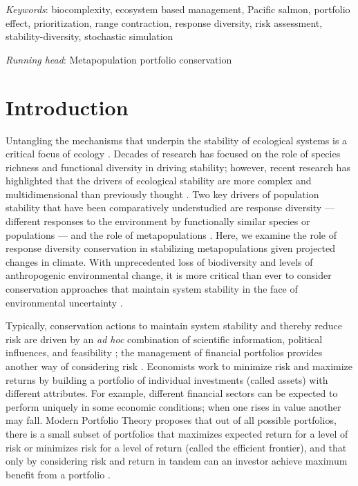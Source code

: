 \noindent
\textit{Keywords}: biocomplexity, ecosystem based management, Pacific salmon, portfolio effect, prioritization, range contraction, response diversity, risk assessment, stability-diversity, stochastic simulation

\noindent
\textit{Running head}: Metapopulation portfolio conservation

\section{Introduction}

Untangling the mechanisms that underpin the stability of ecological systems is a critical focus of ecology \citep[e.g.][]{ives2007, demazancourt2013}. Decades of research has focused on the role of species richness and functional diversity in driving stability; however, recent research has highlighted that the drivers of ecological stability are more complex and multidimensional than previously thought \citep[e.g.][]{balvanera2006, ives2007, demazancourt2013}. Two key drivers of population stability that have been comparatively understudied are response diversity \citep{winfree2009, mori2013} --- different responses to the environment by functionally similar species or populations \citep{elmqvist2003} --- and the role of metapopulations \citep{schtickzelle2007}. Here, we examine the role of response diversity conservation in stabilizing metapopulations given projected changes in climate. With unprecedented loss of biodiversity and levels of anthropogenic environmental change, it is more critical than ever to consider conservation approaches that maintain system stability in the face of environmental uncertainty \citep{lee2008, ando2012}.

Typically, conservation actions to maintain system stability and thereby reduce risk are driven by an \emph{ad hoc} combination of scientific information, political influences, and feasibility \citep{margules2000}; the management of financial portfolios provides another way of considering risk \citep[e.g.][]{figge2004, koellner2006, ando2012, haak2012}. Economists work to minimize risk and maximize returns by building a portfolio of individual investments (called assets) with different attributes. For example, different financial sectors can be expected to perform uniquely in some economic conditions; when one rises in value another may fall. Modern Portfolio Theory proposes that out of all possible portfolios, there is a small subset of portfolios that maximizes expected return for a level of risk or minimizes risk for a level of return (called the efficient frontier), and that only by considering risk and return in tandem can an investor achieve maximum benefit from a portfolio \citep{markowitz1952}.

